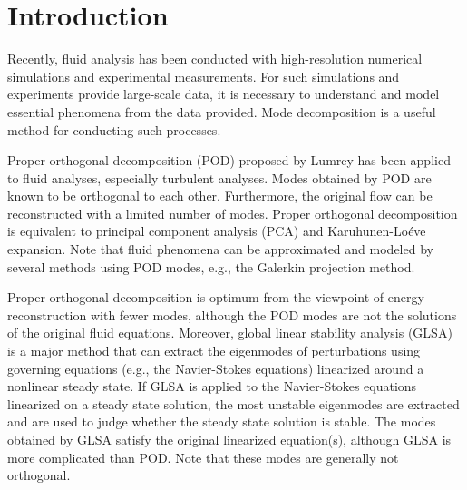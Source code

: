 \documentclass[aip,graphicx]{revtex4-1}
\begin{document}
\pacs{}%

\maketitle %

\section{Introduction}
Recently, fluid analysis has been conducted with high-resolution numerical simulations and experimental measurements. 
For such simulations and experiments provide large-scale data, it is necessary to understand and model essential phenomena from the data provided. Mode decomposition\cite{Taira2017} is a useful method for conducting such processes.

Proper orthogonal decomposition (POD) proposed by Lumrey has been applied to fluid analyses, especially turbulent analyses.\cite{Rowley2004,Berkooz1993}
Modes obtained by POD are known to be orthogonal to each other.
Furthermore, the original flow can be reconstructed with a limited number of modes.  
Proper orthogonal decomposition is equivalent to principal component analysis (PCA) and Karuhunen-Lo\'{e}ve expansion.
Note that fluid phenomena can be approximated and modeled by several methods using POD modes, e.g., the Galerkin projection method.

Proper orthogonal decomposition is optimum from the viewpoint of energy reconstruction with fewer modes, although the POD modes are not the solutions of the original fluid equations. Moreover, global linear stability analysis (GLSA)\cite{Theofilis2011, Shibata2015, Ohmichi2016} is a major method that can extract the eigenmodes of perturbations using governing equations (e.g., the Navier-Stokes equations) linearized around a nonlinear steady state. 
If GLSA is applied to the Navier-Stokes equations linearized on a steady state solution, the most unstable eigenmodes are extracted and are used to  judge whether the steady state solution is stable.
The modes obtained by GLSA satisfy the original linearized equation(s), although GLSA is more complicated than POD.
Note that these modes are generally not orthogonal.
\end{document}
